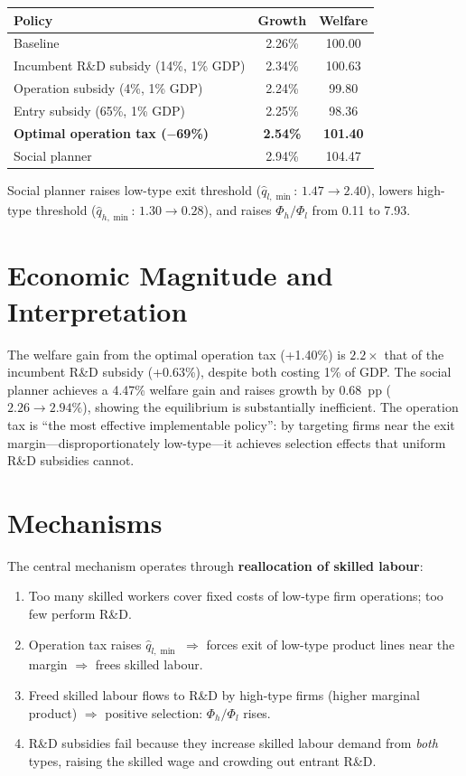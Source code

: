 \begin{center}
\begin{tabular}{lcc}
\toprule
\textbf{Policy} & \textbf{Growth} & \textbf{Welfare} \\
\midrule
Baseline & 2.26\% & 100.00 \\
Incumbent R\&D subsidy (14\%, 1\% GDP) & 2.34\% & 100.63 \\
Operation subsidy (4\%, 1\% GDP) & 2.24\% & 99.80 \\
Entry subsidy (65\%, 1\% GDP) & 2.25\% & 98.36 \\
\textbf{Optimal operation tax ($-$69\%)} & \textbf{2.54\%} & \textbf{101.40} \\
Social planner & 2.94\% & 104.47 \\
\bottomrule
\end{tabular}
\end{center}

Social planner raises low-type exit threshold ($\hat{q}_{l,\min}$: $1.47\to 2.40$),
lowers high-type threshold ($\hat{q}_{h,\min}$: $1.30\to 0.28$), and raises
$\Phi_h/\Phi_l$ from 0.11 to 7.93.

\section{Economic Magnitude and Interpretation}

The welfare gain from the optimal operation tax (+1.40\%) is $2.2\times$ that
of the incumbent R\&D subsidy (+0.63\%), despite both costing 1\% of GDP.
The social planner achieves a 4.47\% welfare gain and raises growth by 0.68~pp
($2.26\to 2.94\%$), showing the equilibrium is substantially inefficient. The
operation tax is ``the most effective implementable policy'': by targeting firms
near the exit margin---disproportionately low-type---it achieves selection
effects that uniform R\&D subsidies cannot.

\section{Mechanisms}

The central mechanism operates through \textbf{reallocation of skilled labour}:
\begin{enumerate}
  \item Too many skilled workers cover fixed costs of low-type firm operations;
    too few perform R\&D.
  \item Operation tax raises $\hat{q}_{l,\min}$ $\Rightarrow$ forces exit of
    low-type product lines near the margin $\Rightarrow$ frees skilled labour.
  \item Freed skilled labour flows to R\&D by high-type firms (higher marginal
    product) $\Rightarrow$ positive selection: $\Phi_h/\Phi_l$ rises.
  \item R\&D subsidies fail because they increase skilled labour demand from
    \emph{both} types, raising the skilled wage and crowding out entrant R\&D.
\end{enumerate}

